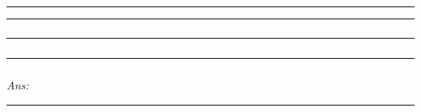 \documentclass[
]{article}
\begin{document}
\begin{center}\rule{0.5\linewidth}{0.5pt}\end{center}

\begin{center}\rule{0.5\linewidth}{0.5pt}\end{center}

\hypertarget{section}{%
\paragraph{}\label{section}}

\hypertarget{section-1}{%
\subparagraph{}\label{section-1}}

\hypertarget{section-2}{%
\paragraph{}\label{section-2}}

\begin{center}\rule{0.5\linewidth}{0.5pt}\end{center}

\hypertarget{section-3}{%
\paragraph{}\label{section-3}}

\hypertarget{section-4}{%
\paragraph{}\label{section-4}}

\hypertarget{section-5}{%
\subparagraph{}\label{section-5}}

\hypertarget{section-6}{%
\subparagraph{}\label{section-6}}

\begin{center}\rule{0.5\linewidth}{0.5pt}\end{center}

\hypertarget{section-7}{%
\subparagraph{}\label{section-7}}

\emph{Ans:}

\begin{center}\rule{0.5\linewidth}{0.5pt}\end{center}

\hypertarget{section-8}{%
\paragraph{}\label{section-8}}
\end{document}
